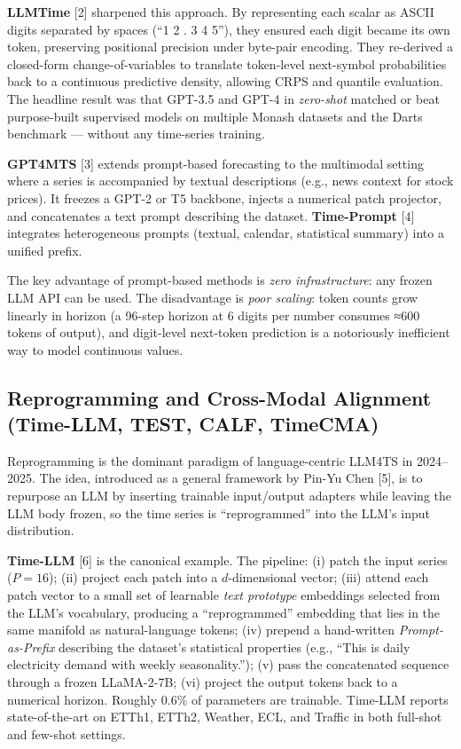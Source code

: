\documentclass{article}
\begin{document}
\textbf{LLMTime} \citep{gruver2023largelanguagemodel} {[}2{]} sharpened this approach. By representing each scalar as ASCII digits separated by spaces (``1 2 . 3 4 5''), they ensured each digit became its own token, preserving positional precision under byte-pair encoding. They re-derived a closed-form change-of-variables to translate token-level next-symbol probabilities back to a continuous predictive density, allowing CRPS and quantile evaluation. The headline result was that GPT-3.5 and GPT-4 in \emph{zero-shot} matched or beat purpose-built supervised models on multiple Monash datasets and the Darts benchmark --- without any time-series training.

\textbf{GPT4MTS} \citep{jia2024gpt4mtspromptbased} {[}3{]} extends prompt-based forecasting to the multimodal setting where a series is accompanied by textual descriptions (e.g., news context for stock prices). It freezes a GPT-2 or T5 backbone, injects a numerical patch projector, and concatenates a text prompt describing the dataset. \textbf{Time-Prompt} \citep{wang2025chattimeaunifiedmu} {[}4{]} integrates heterogeneous prompts (textual, calendar, statistical summary) into a unified prefix.

The key advantage of prompt-based methods is \emph{zero infrastructure}: any frozen LLM API can be used. The disadvantage is \emph{poor scaling}: token counts grow linearly in horizon (a 96-step horizon at 6 digits per number consumes ≈600 tokens of output), and digit-level next-token prediction is a notoriously inefficient way to model continuous values.

\subsection{Reprogramming and Cross-Modal Alignment (Time-LLM, TEST, CALF, TimeCMA)}\label{reprogramming-and-cross-modal-alignment-time-llm-test-calf-timecma}

Reprogramming is the dominant paradigm of language-centric LLM4TS in 2024--2025. The idea, introduced as a general framework by Pin-Yu Chen {[}5{]}, is to repurpose an LLM by inserting trainable input/output adapters while leaving the LLM body frozen, so the time series is ``reprogrammed'' into the LLM's input distribution.

\textbf{Time-LLM} \citep{jin2024timellmtimeseriesf} {[}6{]} is the canonical example. The pipeline: (i) patch the input series (\(P=16\)); (ii) project each patch into a \(d\)-dimensional vector; (iii) attend each patch vector to a small set of learnable \emph{text prototype} embeddings selected from the LLM's vocabulary, producing a ``reprogrammed'' embedding that lies in the same manifold as natural-language tokens; (iv) prepend a hand-written \emph{Prompt-as-Prefix} describing the dataset's statistical properties (e.g., ``This is daily electricity demand with weekly seasonality.''); (v) pass the concatenated sequence through a frozen LLaMA-2-7B; (vi) project the output tokens back to a numerical horizon. Roughly 0.6\% of parameters are trainable. Time-LLM reports state-of-the-art on ETTh1, ETTh2, Weather, ECL, and Traffic in both full-shot and few-shot settings.
\end{document}
